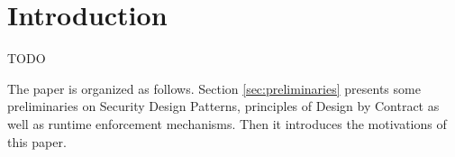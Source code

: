 \section{Introduction}
\label{sec:introduction}

TODO


The paper is organized as follows. Section \ref{sec:preliminaries} presents some preliminaries on Security Design Patterns, principles of Design by Contract as well as runtime enforcement mechanisms. Then it introduces the motivations of this paper. 
